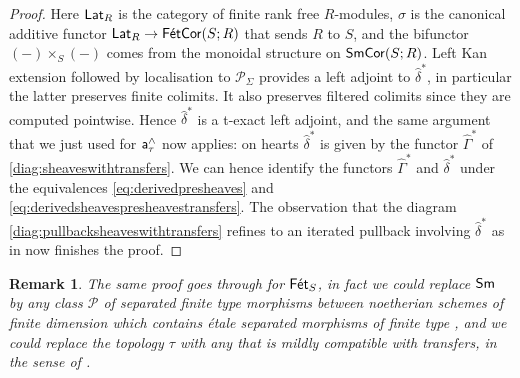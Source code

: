 \documentclass[reqno]{amsart}
\numberwithin{equation}{section}\theoremstyle{thms}
\theoremstyle{defn}
\newtheorem{rem}[equation]{Remark}
\newcommand{\cP}{\mathcal{P}}
\newcommand{\tsf}[1]{\textsf{\textup{#1}}}
\newcommand{\psigma}{\cP_{\Sigma}}
\newcommand{\fets}{\tsf{Fét}_S}
\newcommand{\corsms}[1]{\tsf{SmCor}(S;#1)}
\newcommand{\corfets}[1]{\tsf{FétCor}(S;#1)}
\newcommand{\lat}{\tsf{Lat}}
\begin{document}
\begin{proof}
Here $\lat_R$ is the category of finite rank free $R$-modules, $\sigma$ is the canonical additive functor $\lat_R \to \corfets{R}$ that sends $R$ to $S$, and the bifunctor $(-)\times_S(-)$ comes from the monoidal structure on $\corsms{R}$. Left Kan extension followed by localisation to $\psigma$ provides a left adjoint to $\hat{\delta}^*$, in particular the latter preserves finite colimits. It also preserves filtered colimits since they are computed pointwise. Hence $\hat{\delta}^*$ is a t-exact left adjoint, and the same argument that we just used for $\tsf{a}^{\wedge}_{\tau}$ now applies: on hearts $\hat{\delta}^*$ is given by the functor $\hat{\Gamma}^*$ of \ref{diag:sheaveswithtransfers}. We can hence identify the functors $\hat{\Gamma}^*$ and $\hat{\delta}^*$ under the equivalences \ref{eq:derivedpresheaves} and \ref{eq:derivedsheavespresheavestransfers}. The observation that the diagram \ref{diag:pullbacksheaveswithtransfers} refines to an iterated pullback involving $\hat{\delta}^*$ as in  now finishes the proof.
\end{proof}

\begin{rem}
The same proof goes through for $\fets$, in fact we could replace $\tsf{Sm}$ by any class $\mathscr{P}$ of separated finite type morphisms between noetherian schemes of finite dimension which contains étale separated morphisms of finite type \cite[{}10.0.1]{cd19}, and we could replace the topology $\tau$ with any that is mildly compatible with transfers, in the sense of \cite[Definition 10.3.5]{cd19}.
\end{rem}

\printbibliography
\end{document}
